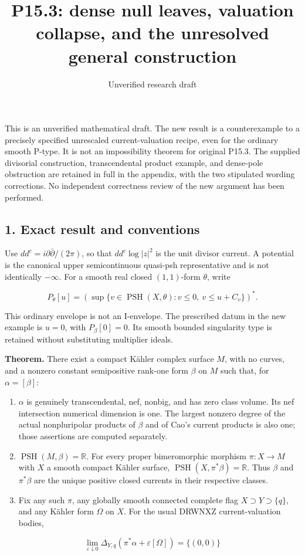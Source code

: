 \documentclass[11pt]{article}
\title{P15.3: dense null leaves, valuation collapse, and the unresolved general construction}
\author{Unverified research draft}
\date{}
\begin{document}
\maketitle


This is an unverified mathematical draft. The new result is a counterexample to a precisely specified unrescaled current-\allowbreak{}valuation recipe, even for the ordinary smooth P-\allowbreak{}type. It is not an impossibility theorem for original P15.3. The supplied divisorial construction, transcendental product example, and dense-\allowbreak{}pole obstruction are retained in full in the appendix, with the two stipulated wording corrections. No independent correctness review of the new argument has been performed.

\subsection{1. Exact result and conventions}

Use $dd^c=i\partial\bar\partial/(2\pi)$, so that $dd^c\log|z|^2$ is the unit divisor current. A potential is the canonical upper semicontinuous quasi-\allowbreak{}psh representative and is not identically $-\infty$. For a smooth real closed $(1,1)$-\allowbreak{}form $\theta$, write

\[P_\theta[u]=\left(\sup\{v\in\operatorname{PSH}(X,\theta):v\leq0,\ v\leq u+C_v\}\right)^*.\]

This ordinary envelope is not an I-\allowbreak{}envelope. The prescribed datum in the new example is $u=0$, with $P_\beta[0]=0$. Its smooth bounded singularity type is retained without substituting multiplier ideals.

\textbf{Theorem.} There exist a compact Kähler complex surface $M$, with no curves, and a nonzero constant semipositive rank-\allowbreak{}one form $\beta$ on $M$ such that, for $\alpha=[\beta]$:

\begin{enumerate}
\item[1.] $\alpha$ is genuinely transcendental, nef, nonbig, and has zero class volume. Its nef intersection numerical dimension is one. The largest nonzero degree of the actual nonpluripolar products of $\beta$ and of Cao's current products is also one; those assertions are computed separately.
\item[2.] $\operatorname{PSH}(M,\beta)=\mathbb R$. For every proper bimeromorphic morphism $\pi:X\to M$ with $X$ a smooth compact Kähler surface, $\operatorname{PSH}(X,\pi^*\beta)=\mathbb R$. Thus $\beta$ and $\pi^*\beta$ are the unique positive closed currents in their respective classes.
\item[3.] Fix any such $\pi$, any globally smooth connected complete flag $X\supset Y\supset\{q\}$, and any Kähler form $\Omega$ on $X$. For the usual DRWNXZ current-\allowbreak{}valuation bodies,

\end{enumerate}
\[\lim_{\varepsilon\downarrow0}\Delta_{Y,q}(\pi^*\alpha+\varepsilon[\Omega])=\{(0,0)\}\]
\end{document}

